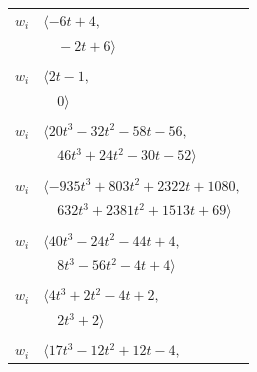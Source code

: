 \documentclass[11pt]{article}
\begin{document}
\begin{longtable}{@{}ll@{}}
$w_i$ & $\langle -6t+4,$\\
 & $\quad -2t+6\rangle$\\
\addlinespace[2pt]
\multicolumn{2}{@{}p{0.97\textwidth}@{}}{$i=35$, $D_i=1$, $\rho_{ij}$: $2{:}2, \allowbreak 13{:}2, \allowbreak 14{:}1, \allowbreak 60{:}2$}\\
$w_i$ & $\langle 2t-1,$\\
 & $\quad 0\rangle$\\
\addlinespace[2pt]
\multicolumn{2}{@{}p{0.97\textwidth}@{}}{$i=36$, $D_i=2$, $\rho_{ij}$: $4{:}2, \allowbreak 13{:}2, \allowbreak 15{:}2, \allowbreak 20{:}2, \allowbreak 42{:}1, \allowbreak 49{:}2, \allowbreak 51{:}1, \allowbreak 57{:}2, \allowbreak 62{:}2$}\\
$w_i$ & $\langle 20t^{3}-32t^{2}-58t-56,$\\
 & $\quad 46t^{3}+24t^{2}-30t-52\rangle$\\
\addlinespace[2pt]
\multicolumn{2}{@{}p{0.97\textwidth}@{}}{$i=37$, $D_i=16$, $\rho_{ij}$: $1{:}2, \allowbreak 5{:}2, \allowbreak 8{:}1, \allowbreak 14{:}1, \allowbreak 15{:}2, \allowbreak 24{:}1, \allowbreak 27{:}2, \allowbreak 31{:}1, \allowbreak 38{:}1, \allowbreak 42{:}2, \allowbreak 48{:}2, \allowbreak 51{:}1, \allowbreak 52{:}1, \allowbreak 64{:}1$}\\
$w_i$ & $\langle -935t^{3}+803t^{2}+2322t+1080,$\\
 & $\quad 632t^{3}+2381t^{2}+1513t+69\rangle$\\
\addlinespace[2pt]
\multicolumn{2}{@{}p{0.97\textwidth}@{}}{$i=38$, $D_i=4$, $\rho_{ij}$: $6{:}1, \allowbreak 8{:}1, \allowbreak 14{:}2, \allowbreak 20{:}2, \allowbreak 28{:}2, \allowbreak 37{:}2, \allowbreak 50{:}1, \allowbreak 63{:}2$}\\
$w_i$ & $\langle 40t^{3}-24t^{2}-44t+4,$\\
 & $\quad 8t^{3}-56t^{2}-4t+4\rangle$\\
\addlinespace[2pt]
\multicolumn{2}{@{}p{0.97\textwidth}@{}}{$i=39$, $D_i=1$, $\rho_{ij}$: $5{:}1, \allowbreak 6{:}2, \allowbreak 8{:}1, \allowbreak 11{:}2, \allowbreak 56{:}1$}\\
$w_i$ & $\langle 4t^{3}+2t^{2}-4t+2,$\\
 & $\quad 2t^{3}+2\rangle$\\
\addlinespace[2pt]
\multicolumn{2}{@{}p{0.97\textwidth}@{}}{$i=40$, $D_i=4$, $\rho_{ij}$: $5{:}2, \allowbreak 8{:}1, \allowbreak 24{:}1, \allowbreak 43{:}2, \allowbreak 59{:}2, \allowbreak 64{:}2, \allowbreak 66{:}1$}\\
$w_i$ & $\langle 17t^{3}-12t^{2}+12t-4,$\\

\end{longtable}
\end{document}
